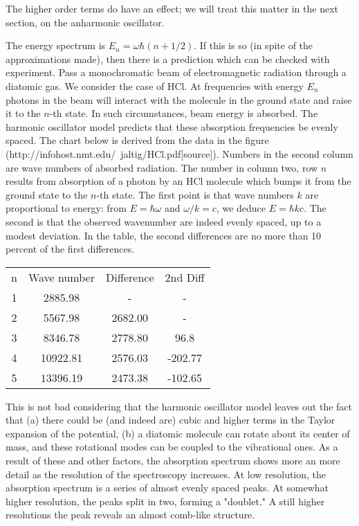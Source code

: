 The higher order terms do have an effect; we will treat this matter in the next section, on the anharmonic oscillator.




The energy spectrum is $E_n =\omega \hbar (n + 1/2)$.
If this is so (in spite of the approximations made), then there is a prediction which can be checked with experiment.  Pass a monochromatic beam of electromagnetic radiation through a diatomic gas.  We consider the case of $\text{HCl}$.  At frequencies with energy $E_n$ photons in the beam will interact with the molecule in the ground state and  raise it to the $n$-th state.  In such circumstances, beam energy is absorbed.  The  harmonic oscillator model predicts that these absorption frequencies be evenly spaced. The chart below is derived from the data in the figure (http://infohost.nmt.edu/~jaltig/HCl.pdf[source]). Numbers in the second column are wave numbers of absorbed radiation.  The number in column two, row $n$ results from absorption of a photon by an $\text{HCl}$ molecule which bumps it from the ground state to the $n$-th state.  The first point is that wave numbers $k$ are proportional to energy: from $E = \hbar \omega$ and $\omega/k = c$, we deduce $E = \hbar k c$.  The second is that the observed wavenumber are indeed evenly spaced, up to a modest deviation.  In the table, the second differences are no more than 10 percent of the first differences.

\begin{indent}
\begin{tabular}{|c|c|c|c|}
n & Wave number   & Difference & 2nd Diff  \\
1 &  2885.98      &      -      &     -      \\
2 &  5567.98      &  2682.00    &     -     \\
3 &  8346.78      &  2778.80    &    96.8  \\
4 & 10922.81      &  2576.03   &   -202.77 \\
5 & 13396.19      &  2473.38   &   -102.65  \\
\end{tabular}
\end{indent}


This is not bad considering that the harmonic oscillator model leaves out the fact that (a) there could be (and indeed are) cubic and higher terms in the Taylor expansion of the potential, (b) a diatomic molecule can rotate about its center of mass, and these rotational modes can be coupled to the vibrational ones.  As a result of these and other factors, the absorption spectrum shows more an more detail as the resolution of the spectroscopy increases.  At low resolution, the absorption spectrum is a series of almost evenly spaced peaks.  At somewhat higher resolution, the peaks split in two, forming a "doublet."  A still higher resolutions the peak reveals an almost comb-like structure.



